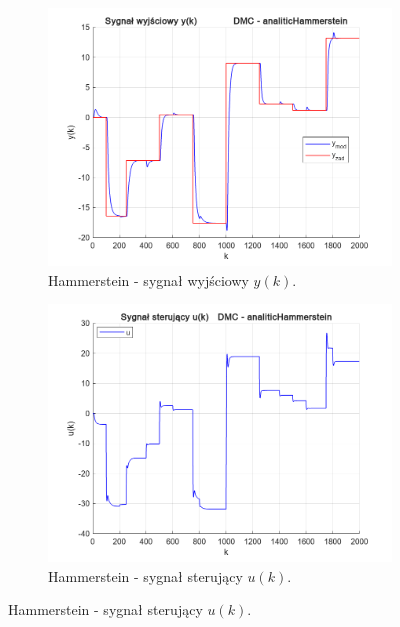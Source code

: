 \begin{figure}[b!]
\centering
\begin{subfigure}[b]{0.49\paperwidth}
\centering
\includegraphics[width=\linewidth]{pictures/y_analiticHammerstein}
\caption{Hammerstein - sygnał wyjściowy $y(k)$.}
\end{subfigure}
\hfill
\begin{subfigure}[b]{0.49\paperwidth}
\centering
\includegraphics[width=\linewidth]{pictures/u_analiticHammerstein}
\caption{Hammerstein -  sygnał sterujący $u(k)$.}
\end{subfigure}
    
\vspace{0.5cm} %


\end{figure}

